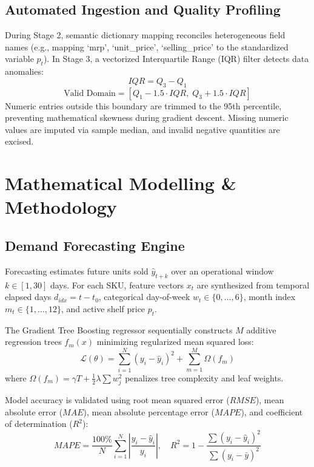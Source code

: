 \documentclass[conference]{IEEEtran}
\begin{document}
\subsection{Automated Ingestion and Quality Profiling}
During Stage 2, semantic dictionary mapping reconciles heterogeneous field names (e.g., mapping `mrp', `unit\_price', `selling\_price' to the standardized variable $p_t$). In Stage 3, a vectorized Interquartile Range (IQR) filter detects data anomalies:
\begin{equation}
IQR = Q_3 - Q_1
\end{equation}
\begin{equation}
\text{Valid Domain} = \left[ Q_1 - 1.5 \cdot IQR, \; Q_3 + 1.5 \cdot IQR \right]
\end{equation}
Numeric entries outside this boundary are trimmed to the 95th percentile, preventing mathematical skewness during gradient descent. Missing numeric values are imputed via sample median, and invalid negative quantities are excised.

\section{Mathematical Modelling \& Methodology}

\subsection{Demand Forecasting Engine}
Forecasting estimates future units sold $\hat{y}_{t+k}$ over an operational window $k \in [1, 30]$ days. For each SKU, feature vectors $x_t$ are synthesized from temporal elapsed days $d_{idx} = t - t_0$, categorical day-of-week $w_t \in \{0, \dots, 6\}$, month index $m_t \in \{1, \dots, 12\}$, and active shelf price $p_t$. 

The Gradient Tree Boosting regressor sequentially constructs $M$ additive regression trees $f_m(x)$ minimizing regularized mean squared loss:
\begin{equation}
\mathcal{L}(\theta) = \sum_{i=1}^N \left( y_i - \hat{y}_i \right)^2 + \sum_{m=1}^M \Omega(f_m)
\end{equation}
where $\Omega(f_m) = \gamma T + \frac{1}{2}\lambda \sum w_j^2$ penalizes tree complexity and leaf weights.

Model accuracy is validated using root mean squared error ($RMSE$), mean absolute error ($MAE$), mean absolute percentage error ($MAPE$), and coefficient of determination ($R^2$):
\begin{equation}
MAPE = \frac{100\%}{N}\sum_{i=1}^N \left| \frac{y_i - \hat{y}_i}{y_i} \right|, \quad R^2 = 1 - \frac{\sum (y_i - \hat{y}_i)^2}{\sum (y_i - \bar{y})^2}
\end{equation}
\end{document}
